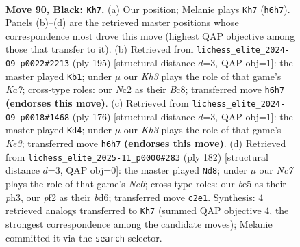 \documentclass[11pt]{article}
\begin{document}
\clearpage

\begin{figure}[p]\centering
\begin{subfigure}{0.46\textwidth}\centering
\resizebox{\linewidth}{!}{%
\newchessgame
\chessboard[
  setfen={8/8/7k/4B3/2b4K/8/2n2P2/8 b - - 26 90},
  showmover=false,
  pgfstyle=straightmove, color=movearrow, markmove={h6-h7}
]}
\caption{}
\end{subfigure}\hfill
\begin{subfigure}{0.46\textwidth}\centering
\resizebox{\linewidth}{!}{%
\newchessgame
\chessboard[
  setfen={2b5/8/1P1B4/8/8/2K5/k7/8 b - - 24 98},
  showmover=false,
  pgfstyle=straightmove, color=movearrow, markmove={a2-b1}
]}
\caption{}
\end{subfigure}
\\[4pt]
\begin{subfigure}{0.46\textwidth}\centering
\resizebox{\linewidth}{!}{%
\newchessgame
\chessboard[
  setfen={8/8/8/8/8/1b2K1p1/8/4N2k w - - 4 89},
  showmover=false,
  pgfstyle=straightmove, color=movearrow, markmove={e3-d4}
]}
\caption{}
\end{subfigure}\hfill
\begin{subfigure}{0.46\textwidth}\centering
\resizebox{\linewidth}{!}{%
\newchessgame
\chessboard[
  setfen={8/8/2Nb4/8/4k3/7p/8/7K w - - 10 92},
  showmover=false,
  pgfstyle=straightmove, color=movearrow, markmove={c6-d8}
]}
\caption{}
\end{subfigure}
\caption{\textbf{Move 90, Black: \texttt{Kh7}.} (a) Our position; Melanie plays \texttt{Kh7} (\texttt{h6h7}). Panels (b)--(d) are the retrieved master positions whose correspondence most drove this move (highest QAP objective among those that transfer to it). (b) Retrieved from \texttt{lichess\_elite\_2024-09\_p0022\#2213} (ply 195) [structural distance $d$=3, QAP obj=1]: the master played \texttt{Kb1}; under $\mu$ our \emph{Kh3} plays the role of that game's \emph{Ka7}; cross-type roles: our \emph{N}c2 as their \emph{B}c8; transferred move \texttt{h6h7} \textbf{(endorses this move)}. (c) Retrieved from \texttt{lichess\_elite\_2024-09\_p0018\#1468} (ply 176) [structural distance $d$=3, QAP obj=1]: the master played \texttt{Kd4}; under $\mu$ our \emph{Kh3} plays the role of that game's \emph{Ke3}; transferred move \texttt{h6h7} \textbf{(endorses this move)}. (d) Retrieved from \texttt{lichess\_elite\_2025-11\_p0000\#283} (ply 182) [structural distance $d$=3, QAP obj=0]: the master played \texttt{Nd8}; under $\mu$ our \emph{Nc7} plays the role of that game's \emph{Nc6}; cross-type roles: our \emph{b}e5 as their \emph{p}h3, our \emph{p}f2 as their \emph{b}d6; transferred move \texttt{c2e1}. Synthesis: 4 retrieved analogs transferred to \texttt{Kh7} (summed QAP objective 4, the strongest correspondence among the candidate moves); Melanie committed it via the \texttt{search} selector.}
\label{fig:thought-m179}
\end{figure}
\end{document}
